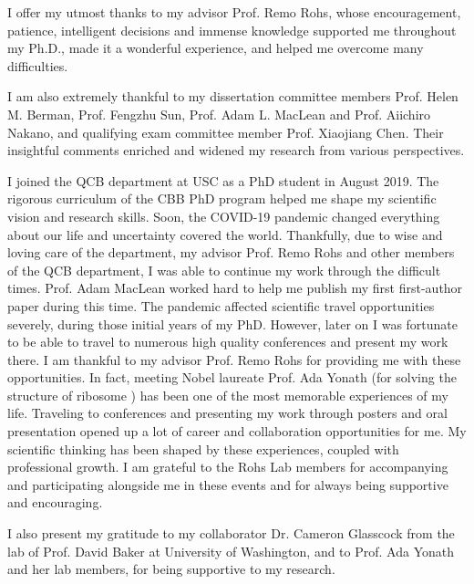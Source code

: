 
I offer my utmost thanks to my advisor Prof. Remo Rohs, whose encouragement, patience, intelligent decisions and immense knowledge supported me throughout my Ph.D., made it a wonderful experience, and helped me overcome many difficulties.

I am also extremely thankful to my dissertation committee members Prof. Helen M. Berman, Prof. Fengzhu Sun, Prof. Adam L. MacLean and Prof. Aiichiro Nakano, and qualifying exam committee member Prof. Xiaojiang Chen. Their insightful comments enriched and widened my research from various perspectives. 

I joined the QCB department at USC as a PhD student in August 2019. The rigorous curriculum of the CBB PhD program helped me shape my scientific vision and research skills. Soon, the COVID-19 pandemic changed everything about our life and uncertainty covered the world. Thankfully, due to wise and loving care of the department, my advisor Prof. Remo Rohs and other members of the QCB department, I was able to continue my work through the difficult times. Prof. Adam MacLean worked hard to help me publish my first first-author paper during this time.  The pandemic affected scientific travel opportunities severely, during those initial years of my PhD. However, later on I was fortunate to be able to travel to numerous high quality conferences and present my work there. I am thankful to my advisor Prof. Remo Rohs for providing me with these opportunities. In fact, meeting Nobel laureate Prof. Ada Yonath (for solving the structure of ribosome \citep{schluenzen2000structure, harms2001high}) has been one of the most memorable experiences of my life. Traveling to conferences and presenting my work through posters and oral presentation opened up a lot of career and collaboration opportunities for me. My scientific thinking has been shaped by these experiences, coupled with professional growth. I am grateful to the Rohs Lab members for accompanying and participating alongside me in these events and for always being supportive and encouraging.

I also present my gratitude to my collaborator Dr. Cameron Glasscock from the lab of Prof. David Baker at University of Washington, and to Prof. Ada Yonath and her lab members, for being supportive to my research. 

